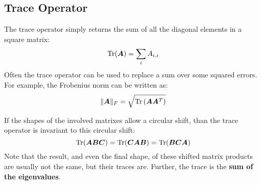 \begin{multicols}{2}
	\subsection{Trace Operator}
	The trace operator simply returns the sum of all the diagonal elements in a square matrix:
	\[ \text{Tr}(\bolA) = \sum_i A_{i,i} \]
	Often the trace operator can be used to replace a sum over some squared errors.
	For example, the Frobenius norm can be written as:
	\[ \lVert \bolA \rVert_F = \sqrt{\text{Tr}\left(\bolA\bolA^T\right)} \]
	
	If the shapes of the involved matrixes allow a circular shift, than the trace operator is invariant to this circular shift:
	\[ \text{Tr}(\bolA\bol{B}\bol{C}) = \text{Tr}(\bol{C}\bolA\bol{B}) = \text{Tr}(\bol{B}\bol{C}\bolA) \]
	Note that the result, and even the final shape, of these shifted matrix products are usually not the same, but their traces are.
	Further, the trace is the \textbf{sum of the eigenvalues}.
	

\end{multicols}

